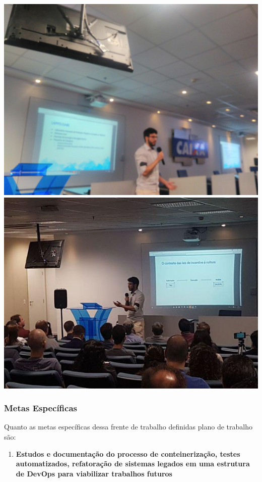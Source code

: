 \includegraphics{figs/pydatamoura.jpg}
\includegraphics{figs/pydatamoura2.jpg}

\hypertarget{metas-especuxedficas}{%
\subsubsection{Metas Específicas}\label{metas-especuxedficas}}

Quanto as metas específicas dessa frente de trabalho definidas plano de
trabalho são:

\begin{enumerate}
\def\labelenumi{\arabic{enumi}.}
\tightlist
\item
  \textbf{Estudos e documentação do processo de conteinerização, testes
  automatizados, refatoração de sistemas legados em uma estrutura de
  DevOps para viabilizar trabalhos futuros}
\end{enumerate}

